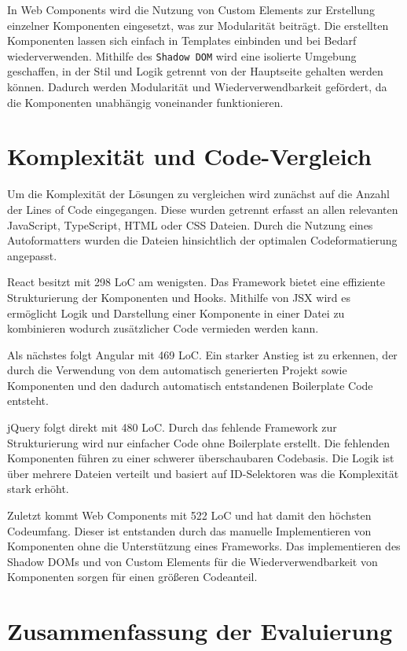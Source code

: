 \documentclass[oneside]{ausarbeitung}
\begin{document}
In Web Components wird die Nutzung von Custom Elements zur Erstellung einzelner Komponenten eingesetzt, was zur Modularität beiträgt. Die erstellten Komponenten lassen sich einfach in Templates einbinden und bei Bedarf wiederverwenden. Mithilfe des \texttt{Shadow DOM} wird eine isolierte Umgebung geschaffen, in der Stil und Logik getrennt von der Hauptseite gehalten werden können. Dadurch werden Modularität und Wiederverwendbarkeit gefördert, da die Komponenten unabhängig voneinander funktionieren.

\section{Komplexität und Code-Vergleich}

Um die Komplexität der Lösungen zu vergleichen wird zunächst auf die Anzahl der Lines of Code eingegangen. Diese wurden getrennt erfasst an allen relevanten JavaScript, TypeScript, HTML oder CSS Dateien. Durch die Nutzung eines Autoformatters wurden die Dateien hinsichtlich der optimalen Codeformatierung angepasst. 

React besitzt mit 298 LoC am wenigsten. Das Framework bietet eine effiziente Strukturierung der Komponenten und Hooks. Mithilfe von JSX wird es ermöglicht Logik und Darstellung einer Komponente in einer Datei zu kombinieren wodurch zusätzlicher Code vermieden werden kann. 

Als nächstes folgt Angular mit 469 LoC. Ein starker Anstieg ist zu erkennen, der durch die Verwendung von dem automatisch generierten Projekt sowie Komponenten und den dadurch automatisch entstandenen Boilerplate Code entsteht. 

jQuery folgt direkt mit 480 LoC. Durch das fehlende Framework zur Strukturierung wird nur einfacher Code ohne Boilerplate erstellt. Die fehlenden Komponenten führen zu einer schwerer überschaubaren Codebasis. Die Logik ist über mehrere Dateien verteilt und basiert auf ID-Selektoren was die Komplexität stark erhöht. 

Zuletzt kommt Web Components mit 522 LoC und hat damit den höchsten Codeumfang. Dieser ist entstanden durch das manuelle Implementieren von Komponenten ohne die Unterstützung eines Frameworks. Das implementieren des Shadow DOMs und von Custom Elements für die Wiederverwendbarkeit von Komponenten sorgen für einen größeren Codeanteil. 

\section{Zusammenfassung der Evaluierung}
\end{document}
